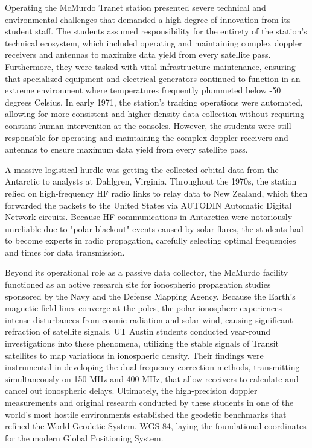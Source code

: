 Operating the McMurdo Tranet station presented severe technical and environmental challenges that demanded a high degree of innovation from its student staff. The students assumed responsibility for the entirety of the station's technical ecosystem, which included operating and maintaining complex doppler receivers and antennas to maximize data yield from every satellite pass. Furthermore, they were tasked with vital infrastructure maintenance, ensuring that specialized equipment and electrical generators continued to function in an extreme environment where temperatures frequently plummeted below -50 degrees Celsius. In early 1971, the station's tracking operations were automated, allowing for more consistent and higher-density data collection without requiring constant human intervention at the consoles. However, the students were still responsible for operating and maintaining the complex doppler receivers and antennas to ensure maximum data yield from every satellite pass. 

A massive logistical hurdle was getting the collected orbital data from the Antarctic to analysts at Dahlgren, Virginia. Throughout the 1970s, the station relied on high-frequency HF radio links to relay data to New Zealand, which then forwarded the packets to the United States via AUTODIN Automatic Digital Network circuits. Because HF communications in Antarctica were notoriously unreliable due to "polar blackout" events caused by solar flares, the students had to become experts in radio propagation, carefully selecting optimal frequencies and times for data transmission.

Beyond its operational role as a passive data collector, the McMurdo facility functioned as an active research site for ionospheric propagation studies sponsored by the Navy and the Defense Mapping Agency. Because the Earth's magnetic field lines converge at the poles, the polar ionosphere experiences intense disturbances from cosmic radiation and solar wind, causing significant refraction of satellite signals. UT Austin students conducted year-round investigations into these phenomena, utilizing the stable signals of Transit satellites to map variations in ionospheric density. Their findings were instrumental in developing the dual-frequency correction methods, transmitting simultaneously on 150 MHz and 400 MHz, that allow receivers to calculate and cancel out ionospheric delays. Ultimately, the high-precision doppler measurements and original research conducted by these students in one of the world's most hostile environments established the geodetic benchmarks that refined the World Geodetic System, WGS 84, laying the foundational coordinates for the modern Global Positioning System.

